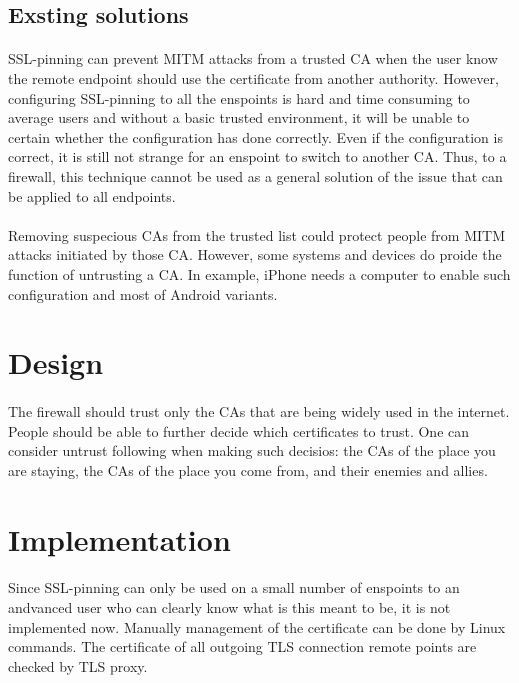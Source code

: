 \documentclass[mscthesis]{usiinfthesis}
\begin{document}
\subsection{Exsting solutions}
\paragraph{}
SSL-pinning can prevent MITM attacks from a trusted CA when the user know the remote endpoint should use the certificate from another authority. However, configuring SSL-pinning to all the enspoints is hard and time consuming to average users and without a basic trusted environment, it will be unable to certain whether the configuration has done correctly. Even if the configuration is correct, it is still not strange for an enspoint to switch to another CA. Thus, to a firewall, this technique cannot be used as a general solution of the issue that can be applied to all endpoints.
\paragraph{}
Removing suspecious CAs from the trusted list could protect people from MITM attacks initiated by those CA. However, some systems and devices do proide the function of untrusting a CA. In example, iPhone needs a computer to enable such configuration and most of Android variants.
\section{Design}
\paragraph{}
The firewall should trust only the CAs that are being widely used in the internet. People should be able to further decide which certificates to trust. One can consider untrust following when making such decisios: the CAs of the place you are staying, the CAs of the place you come from, and their enemies and allies.
\section{Implementation}
\paragraph{}
Since SSL-pinning can only be used on a small number of enspoints to an andvanced user who can clearly know what is this meant to be, it is not implemented now. Manually management of the certificate can be done by Linux commands. The certificate of all outgoing TLS connection remote points are checked by TLS proxy.
\end{document}

